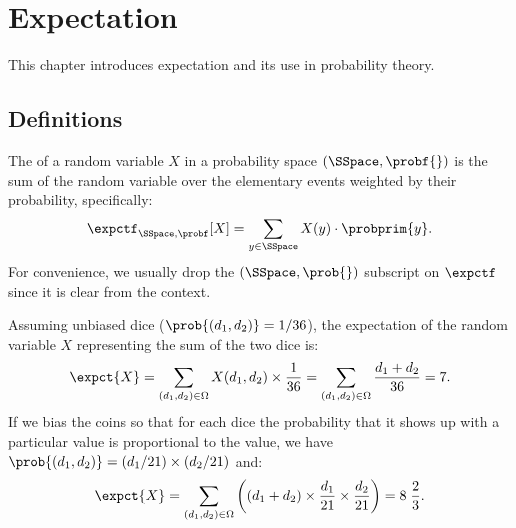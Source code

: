 \chapter{Expectation}
\label{ch:probability::expectation}

\begin{cluster}
\label{grp:prmbl:probability::expectation::introduces}

\begin{preamble}
\label{prmbl:probability::expectation::introduces}
This chapter introduces expectation and its use in probability theory.

\end{preamble}
\end{cluster}


\section{Definitions}
\label{sec:probability::expectation::definitions}

\begin{flex}
\label{grp:grm:probability::expectation::expectation}

\begin{gram}
\label{grm:probability::expectation::expectation}
  The  of a random variable $X$ in a probability space
  $(\SSpace,\probf{})$ is the sum of the random variable over the
elementary events weighted by their probability, specifically:
\[
\expctf_{\SSpace,\probf}[X] = \sum_{y \in \SSpace} X(y) \cdot
\probprim{y}.
\] 
For convenience, we  usually drop the $(\SSpace,\prob{})$
subscript on $\expctf$ since it is clear from the context.

\end{gram}

\begin{example}
\label{ex:probability::expectation::dice}
Assuming unbiased dice ($\prob{(d_1,d_2)} = 1/36$), the expectation of
  the random variable $X$ representing the sum of the two dice is:
\[ 
\expct{X} = \sum_{(d_1,d_2) \in \Omega} X(d_1,d_2)
\times \frac{1}{36} = \sum_{(d_1,d_2) \in \Omega} \frac{d_1+d_2}{36} =
7.
\]
If we bias the coins so that for each dice the probability that it
shows up with a particular value is proportional to the value, we
have $\prob{(d_1,d_2)} = (d_1/21) \times (d_2/21)$ and:
\[ 
\expct{X} = \sum_{(d_1,d_2) \in \Omega} \left((d_1+d_2) \times \frac{d_1}{21}\times\frac{d_2}{21}\right) = 8\; \frac{2}{3}.\]

\end{example}
\end{flex}

